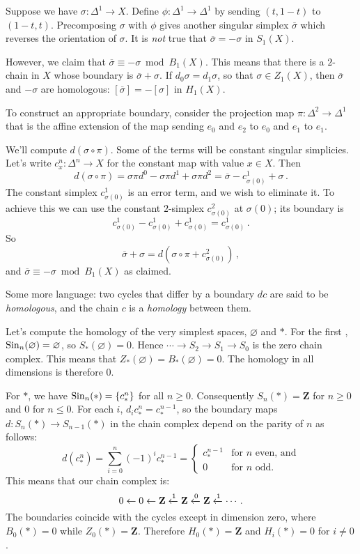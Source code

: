 \begin{example} Suppose we have $\sigma\colon \Delta^1\to X$. Define $\phi\colon\Delta^1\to\Delta^1$ by sending $(t,1-t)$ to $(1-t,t)$. Precomposing $\sigma$ with $\phi$ gives another singular simplex $\overline{\sigma}$ which reverses the orientation of $\sigma$. It is \textit{not} true that $\overline{\sigma}=-\sigma$ in $S_1(X)$.

However, we claim that $\overline{\sigma}\equiv -\sigma\bmod B_1(X)$. This means that there is a $2$-chain in $X$ whose boundary is $\overline{\sigma}+\sigma$. If $d_0\sigma=d_1\sigma$, so that $\sigma\in Z_1(X)$, then $\overline{\sigma}$ and $-\sigma$ are homologous: $[\overline{\sigma}]=-[\sigma]$ in $ H_1(X)$.

To construct an appropriate boundary, consider the projection map 
$\pi:\Delta^2\to\Delta^1$ that is the affine extension of the map sending
$e_0$ and $e_2$ to $e_0$ and $e_1$ to $e_1$.  

 
We'll compute $d(\sigma\circ\pi)$. Some of the terms will be constant
singular simplicies. Let's write $c_x^n:\Delta^n\to X$ for the constant map 
with value $x\in X$. Then
\[
d(\sigma\circ\pi)=\sigma\pi d^0-\sigma\pi d^1 +\sigma\pi d^2=\overline{\sigma}-c^1_{\sigma(0)}+\sigma\,.
\]
The constant simplex $c^1_{\sigma(0)}$ is an error term, and we wish to 
eliminate it. To achieve this we can use the constant $2$-simplex $c^2_{\sigma(0)}$ at $\sigma(0)$; its boundary is
\[
c^1_{\sigma(0)}-c^1_{\sigma(0)}+c^1_{\sigma(0)}=c^1_{\sigma(0)}\,.
\] 
So 
\[
\overline{\sigma}+\sigma=d(\sigma\circ\pi + c^2_{\sigma(0)})\,,
\] 
and $\overline{\sigma}\equiv -\sigma\bmod B_1(X)$ as claimed.

Some more language: two cycles that differ by a boundary $dc$ are said to be {\em homologous}, and the chain $c$ is a {\em homology} between them. 

\end{example}

Let's compute the homology of the very simplest spaces, $\varnothing$ and $\ast$. For the first , $\mathrm{Sin}_n(\varnothing)=\varnothing$, so $S_\ast(\varnothing)=0$. Hence $\cdots\to S_2\to S_1\to S_0$ is the zero chain complex. This means that $Z_\ast(\varnothing)=B_\ast(\varnothing)=0$. The homology in all dimensions is therefore $0$.

For $\ast$, we have $\mathrm{Sin}_n(\ast)=\{c^n_\ast\}$ for all $n\geq 0$. Consequently $S_n(\ast)=\mathbf{Z}$ for $n\geq0$ and $0$ for $n\leq0$. 
For each $i$, $d_ic^n_\ast=c^{n-1}_\ast$, so
the boundary maps $d\colon S_n(\ast)\to S_{n-1}(\ast)$ in the chain complex depend on the parity of $n$ as follows:
\[d(c^n_\ast)=\sum_{i=0}^{n}(-1)^i c^{n-1}_\ast=
\begin{cases}
    c^{n-1}_* & \text{for } n \text{ even, and}\\
    0 & \text{for } n \text{ odd.}
  \end{cases}
\]
This means that our chain complex is:
\[
0\leftarrow0\leftarrow\mathbf Z\xleftarrow{1}\mathbf Z\xleftarrow{0}\mathbf Z\xleftarrow{1}\cdots\,.\]
The boundaries coincide with the cycles except in dimension zero, where $B_0(\ast)=0$ while $Z_0(\ast)=\mathbf{Z}$. Therefore $ H_0(\ast)=\mathbf{Z}$ and $ H_i(\ast)=0$ for $i\neq0$.

